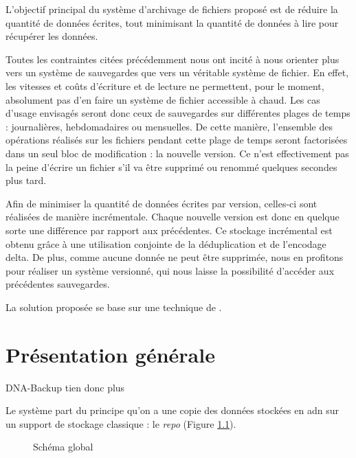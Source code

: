\documentclass[a4paper]{report}
\begin{document}
L'objectif principal du système d'archivage de fichiers proposé est de réduire la quantité de données écrites, tout minimisant la quantité de données à lire pour récupérer les données.

Toutes les contraintes citées précédemment nous ont incité %
à nous orienter plus vers un système de sauvegardes que vers un véritable système de fichier.
En effet, les vitesses et coûts d'écriture et de lecture ne permettent, pour le moment, absolument pas d'en faire un système de fichier accessible à chaud.
Les cas d'usage envisagés seront donc ceux de sauvegardes sur différentes plages de temps : journalières, hebdomadaires ou mensuelles.
De cette manière, l'ensemble des opérations réalisés sur les fichiers pendant cette plage de temps seront factorisées dans un seul bloc de modification : la nouvelle version.
Ce n'est effectivement pas la peine d'écrire un fichier s'il va être supprimé ou renommé quelques secondes plus tard.

Afin de minimiser la quantité de données écrites par version, celles-ci sont réalisées de manière incrémentale.
Chaque nouvelle version est donc en quelque sorte une différence par rapport aux précédentes.
Ce stockage incrémental est obtenu grâce à une utilisation conjointe de la déduplication et de l'encodage delta.
De plus, comme aucune donnée ne peut être supprimée, nous en profitons pour réaliser un système versionné, qui nous laisse la possibilité d'accéder aux précédentes sauvegardes.




La solution proposée se base sur une technique de  \cite{shilane2012wan}.

\chapter{Présentation générale}

DNA-Backup tien donc plus 

Le système part du principe qu'on a une copie des données stockées en
\ac{adn} sur un support de stockage classique : le \emph{repo} (Figure \ref{fig:big-picture}).
\begin{figure}[ht]
\centering


\caption{Schéma global}
\label{fig:big-picture}
\end{figure}
\end{document}
